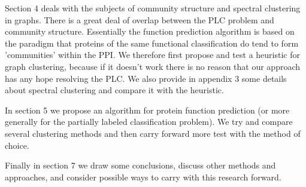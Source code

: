 Section 4 deals with the subjects
of community structure and spectral clustering in graphs. There is
a great deal of overlap between the PLC problem and community structure. 
Essentially the function prediction algorithm is based on the
paradigm that proteins of the same functional classification do tend
to form 'communities' within the PPI. We therefore first propose and
test a heuristic for graph clustering, because if it doesn't work
there is no reason that our approach has any hope resolving the PLC.
We also provide in appendix 3 some details about spectral clustering
and compare it with the heuristic.

In section 5 we propose an algorithm for protein function prediction
(or more generally for the partially labeled classification
problem). We try and compare several clustering methods and then
carry forward more test with the method of choice.

Finally in section 7 we draw some conclusions, discuss other
methods and approaches, and consider possible ways to carry with
this research forward.
